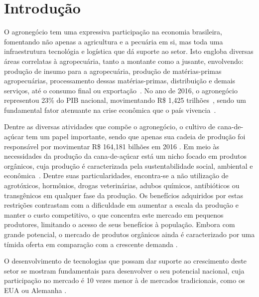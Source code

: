 \documentclass[
	12pt,				%
	oneside,			%
	a4paper,			%
	english,			%
	french,				%
	spanish,			%
	brazil,				%
	]{abntex2}
\begin{document}


\textual


\chapter*[Introdução]{Introdução}

  O agronegócio tem uma expressiva participação na economia brasileira, fomentando não apenas a agricultura e a pecuária em si, mas toda uma infraestrutura tecnológia e logística que dá suporte ao setor. Isto engloba diversas áreas correlatas à agropecuária, tanto a montante como a jusante, envolvendo: produção de insumo para a agropecuária, produção de matérias-primas agropecuárias, processamento dessas matérias-primas, distribuição e demais serviços, até o consumo final ou exportação~\cite{cepea}. No ano de 2016, o agronegócio representou 23\% do PIB nacional, movimentando R\$ 1,425 trilhões~\cite{cna}, sendo um fundamental fator atenuante na crise econômica que o país vivencia~\cite{}.
  
  Dentre as diversas atividades que compõe o agronegócio, o cultivo de cana-de-açúcar tem um papel importante, sendo que apenas sua  cadeia de produção foi responsável por movimentar R\$ 164,181 bilhões em 2016 \cite{cna}. Em meio às necessidades da produção da cana-de-açúcar está um nicho focado em produtos orgânicos, cuja produção é caracterizada pela sustentabilidade social, ambiental e econômica~\cite{organicos_canal_rural}. Dentre suas particularidades, encontra-se a não utilização de agrotóxicos, hormônios, drogas veterinárias, adubos químicos, antibióticos ou transgênicos em qualquer fase da produção. Os benefícios adquiridos por estas restrições contrastam com a dificuldade em aumentar a escala da produção e manter o custo competitivo, o que concentra este mercado em pequenos produtores, limitando o acesso de seus benefícios à população. Embora com grande potencial, o mercado de produtos orgânicos ainda é caracterizado por uma tímida oferta em comparação com a crescente demanda \cite{organicos_carta_capital}.
  
  O desenvolvimento de tecnologias que possam dar suporte ao crescimento deste setor se mostram fundamentais para desenvolver o seu potencial nacional, cuja participação no mercado é 10 vezes menor à de mercados tradicionais, como os EUA ou Alemanha \cite{organicos_carta_capital}. 
  
\end{document}
